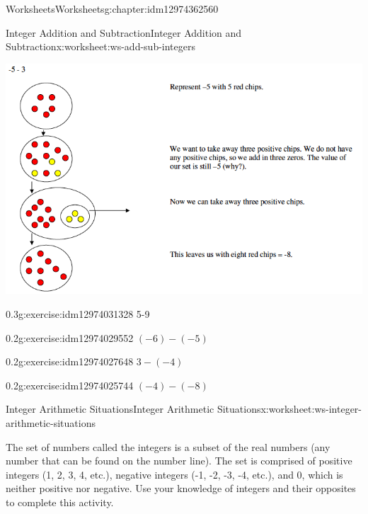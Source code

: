 \documentclass[twoside,11pt,]{book}
\begin{document}
\begin{chapterptx}{Worksheets}{}{Worksheets}{}{}{g:chapter:idm12974362560}
\begin{worksheet-section-numberless}{Integer Addition and Subtraction}{}{Integer Addition and Subtraction}{}{}{x:worksheet:ws-add-sub-integers}
\begin{introduction}{}
\begin{sidebyside}{1}{0}{0}{0}
\begin{sbspanel}{1}
\includegraphics[width=1\linewidth]{images/integer-sub-model.png}
\end{sbspanel}%
\end{sidebyside}%
%
\end{introduction}%
\begin{divisionexercise}{5}{}{0.3}{g:exercise:idm12974031328}%
5-9%
\end{divisionexercise}%
\clearpage
\begin{divisionexercise}{6}{}{0.2}{g:exercise:idm12974029552}%
\((-6)-(-5) \)%
\end{divisionexercise}%
\begin{divisionexercise}{7}{}{0.2}{g:exercise:idm12974027648}%
\(3-(-4) \)%
\end{divisionexercise}%
\begin{divisionexercise}{8}{}{0.2}{g:exercise:idm12974025744}%
\((-4)-(-8) \)%
\end{divisionexercise}%
\end{worksheet-section-numberless}
\restoregeometry
%
%
\typeout{************************************************}
\typeout{************************************************}
%
\begin{worksheet-section-numberless}{Integer Arithmetic Situations}{}{Integer Arithmetic Situations}{}{}{x:worksheet:ws-integer-arithmetic-situations}
\begin{introduction}{}%
The set of numbers called the integers is a subset of the real numbers (any number that can be found on the number line).  The set is comprised of positive integers (1, 2, 3, 4, etc.), negative integers (-1, -2, -3, -4, etc.), and 0, which is neither positive nor negative.  Use your knowledge of integers and their opposites to complete this activity.%

\end{introduction}
\end{worksheet-section-numberless}
\end{chapterptx}
\end{document}
